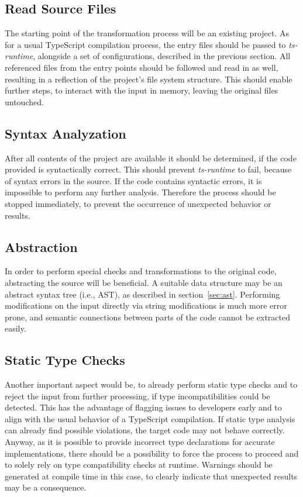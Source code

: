 \subsection{Read Source Files}

The starting point of the transformation process will be an existing project. As for a usual TypeScript compilation process, the entry files should be passed to \emph{ts-runtime}, alongside a set of configurations, described in the previous section. All referenced files from the entry points should be followed and read in as well, resulting in a reflection of the project's file system structure. This should enable further steps, to interact with the input in memory, leaving the original files untouched.

\subsection{Syntax Analyzation}

After all contents of the project are available it should be determined, if the code provided is syntactically correct. This should prevent \emph{ts-runtime} to fail, because of syntax errors in the source. If the code contains syntactic errors, it is impossible to perform any further analysis. Therefore the process should be stopped immediately, to prevent the occurrence of unexpected behavior or results.

\subsection{Abstraction}

In order to perform special checks and transformations to the original code, abstracting the source will be beneficial. A suitable data structure may be an abstract syntax tree (i.e., AST), as described in section~\ref{sec:ast}. Performing modifications on the input directly via string modifications is much more error prone, and semantic connections between parts of the code cannot be extracted easily.

\subsection{Static Type Checks}

Another important aspect would be, to already perform static type checks and to reject the input from further processing, if type incompatibilities could be detected. This has the advantage of flagging issues to developers early and to align with the usual behavior of a TypeScript compilation. If static type analysis can already find possible violations, the target code may not behave correctly. Anyway, as it is possible to provide incorrect type declarations for accurate implementations, there should be a possibility to force the process to proceed and to solely rely on type compatibility checks at runtime. Warnings should be generated at compile time in this case, to clearly indicate that unexpected results may be a consequence.

